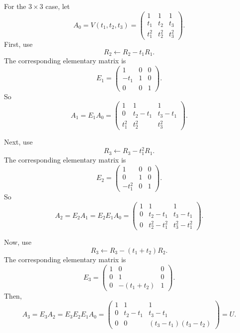 \documentclass[10pt]{extarticle}
\begin{document}
For the $3\times 3$ case, let
\[
\!A_0=V(t_1,t_2,t_3)=
\begin{pmatrix}
1 & 1 & 1\\
t_1 & t_2 & t_3\\
t_1^2 & t_2^2 & t_3^2
\end{pmatrix}.
\]
First, use
\[
R_2\leftarrow R_2-t_1R_1.
\]
The corresponding elementary matrix is
\[
E_1=
\begin{pmatrix}
1 & 0 & 0\\
-t_1 & 1 & 0\\
0 & 0 & 1
\end{pmatrix}.
\]
So
\[
A_1=E_1A_0=
\begin{pmatrix}
1 & 1 & 1\\
0 & t_2-t_1 & t_3-t_1\\
t_1^2 & t_2^2 & t_3^2
\end{pmatrix}.
\]

Next, use
\[
R_3\leftarrow R_3-t_1^2R_1.
\]
The corresponding elementary matrix is
\[
E_2=
\begin{pmatrix}
1 & 0 & 0\\
0 & 1 & 0\\
-t_1^2 & 0 & 1
\end{pmatrix}.
\]
So
\[
A_2=E_2A_1=E_2E_1A_0=
\begin{pmatrix}
1 & 1 & 1\\
0 & t_2-t_1 & t_3-t_1\\
0 & t_2^2-t_1^2 & t_3^2-t_1^2
\end{pmatrix}.
\]

Now, use
\[
R_3\leftarrow R_3-(t_1+t_2)R_2.
\]
The corresponding elementary matrix is
\[
E_3=
\begin{pmatrix}
1 & 0 & 0\\
0 & 1 & 0\\
0 & -(t_1+t_2) & 1
\end{pmatrix}.
\]
Then,
\[
A_3=E_3A_2=E_3E_2E_1A_0
=
\begin{pmatrix}
1 & 1 & 1\\
0 & t_2-t_1 & t_3-t_1\\
0 & 0 & (t_3-t_1)(t_3-t_2)
\end{pmatrix}
=U.
\]
\end{document}
